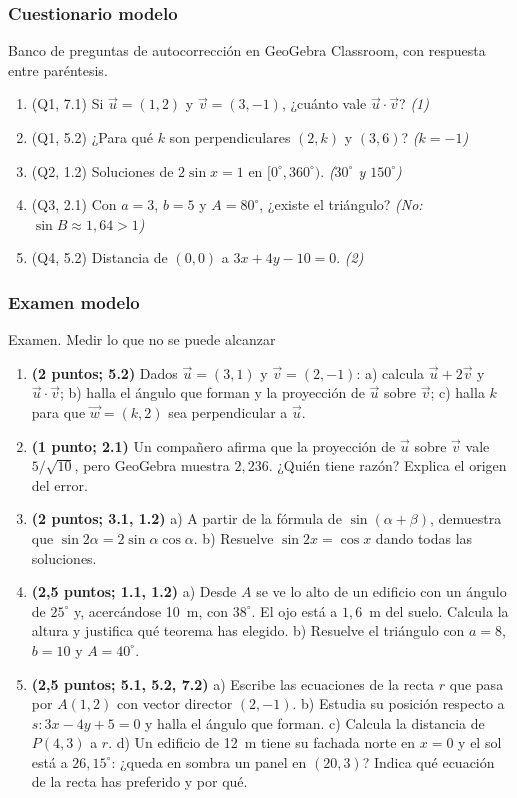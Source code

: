 \subsubsection{Cuestionario modelo}
Banco de preguntas de autocorrección en GeoGebra Classroom, con respuesta entre paréntesis.
\begin{enumerate}[label=\textbf{\arabic*.},leftmargin=1.6em]
  \item (Q1, 7.1) Si $\vec u=(1,2)$ y $\vec v=(3,-1)$, ¿cuánto vale $\vec u\cdot\vec v$? \emph{(1)}
  \item (Q1, 5.2) ¿Para qué $k$ son perpendiculares $(2,k)$ y $(3,6)$? \emph{($k=-1$)}
  \item (Q2, 1.2) Soluciones de $2\sin x=1$ en $[0^\circ,360^\circ)$. \emph{($30^\circ$ y $150^\circ$)}
  \item (Q3, 2.1) Con $a=3$, $b=5$ y $A=80^\circ$, ¿existe el triángulo? \emph{(No: $\sin B\approx 1{,}64>1$)}
  \item (Q4, 5.2) Distancia de $(0,0)$ a $3x+4y-10=0$. \emph{(2)}
\end{enumerate}

\subsubsection{Examen modelo}\label{sec:examen}
\begin{tarjeta}{Examen. Medir lo que no se puede alcanzar}
\begin{enumerate}[label=\textbf{\arabic*.},leftmargin=1.6em,itemsep=3pt]
  \item \textbf{(2 puntos; 5.2)} Dados $\vec u=(3,1)$ y $\vec v=(2,-1)$: a) calcula $\vec u+2\vec v$ y $\vec u\cdot\vec v$; b) halla el ángulo que forman y la proyección de $\vec u$ sobre $\vec v$; c) halla $k$ para que $\vec w=(k,2)$ sea perpendicular a $\vec u$.
  \item \textbf{(1 punto; 2.1)} Un compañero afirma que la proyección de $\vec u$ sobre $\vec v$ vale $5/\sqrt{10}$, pero GeoGebra muestra $2{,}236$. ¿Quién tiene razón? Explica el origen del error.
  \item \textbf{(2 puntos; 3.1, 1.2)} a) A partir de la fórmula de $\sin(\alpha+\beta)$, demuestra que $\sin 2\alpha=2\sin\alpha\cos\alpha$. b) Resuelve $\sin 2x=\cos x$ dando todas las soluciones.
  \item \textbf{(2,5 puntos; 1.1, 1.2)} a) Desde $A$ se ve lo alto de un edificio con un ángulo de $25^\circ$ y, acercándose 10~m, con $38^\circ$. El ojo está a $1{,}6$~m del suelo. Calcula la altura y justifica qué teorema has elegido. b) Resuelve el triángulo con $a=8$, $b=10$ y $A=40^\circ$.
  \item \textbf{(2,5 puntos; 5.1, 5.2, 7.2)} a) Escribe las ecuaciones de la recta $r$ que pasa por $A(1,2)$ con vector director $(2,-1)$. b) Estudia su posición respecto a $s: 3x-4y+5=0$ y halla el ángulo que forman. c) Calcula la distancia de $P(4,3)$ a $r$. d) Un edificio de 12~m tiene su fachada norte en $x=0$ y el sol está a $26{,}15^\circ$: ¿queda en sombra un panel en $(20,3)$? Indica qué ecuación de la recta has preferido y por qué.
\end{enumerate}
\end{tarjeta}

